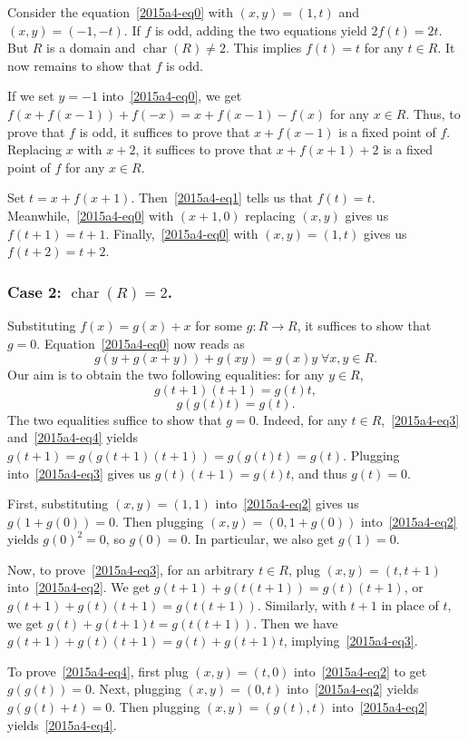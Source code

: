 \documentclass{article}
\DeclareMathOperator{\rchar}{char}
\begin{document}
Consider the equation~\eqref{2015a4-eq0} with $(x, y) = (1, t)$ and $(x, y) = (-1, -t)$.
If $f$ is odd, adding the two equations yield $2 f(t) = 2t$.
But $R$ is a domain and $\rchar(R) \neq 2$.
This implies $f(t) = t$ for any $t \in R$.
It now remains to show that $f$ is odd.

If we set $y = -1$ into~\eqref{2015a4-eq0}, we get $f(x + f(x - 1)) + f(-x) = x + f(x - 1) - f(x)$ for any $x \in R$.
Thus, to prove that $f$ is odd, it suffices to prove that $x + f(x - 1)$ is a fixed point of $f$.
Replacing $x$ with $x + 2$, it suffices to prove that $x + f(x + 1) + 2$ is a fixed point of $f$ for any $x \in R$.

Set $t = x + f(x + 1)$.
Then~\eqref{2015a4-eq1} tells us that $f(t) = t$.
Meanwhile,~\eqref{2015a4-eq0} with $(x + 1, 0)$ replacing $(x, y)$ gives us $f(t + 1) = t + 1$.
Finally,~\eqref{2015a4-eq0} with $(x, y) = (1, t)$ gives us $f(t + 2) = t + 2$.


\subsubsection*{Case 2: $\rchar(R) = 2$.}

Substituting $f(x) = g(x) + x$ for some $g : R \to R$, it suffices to show that $g = 0$.
Equation~\eqref{2015a4-eq0} now reads as
\[ g(y + g(x + y)) + g(xy) = g(x) y \; \forall x, y \in R. \tag{2}\label{2015a4-eq2} \]
Our aim is to obtain the two following equalities: for any $y \in R$,
\[ g(t + 1) (t + 1) = g(t) t, \tag{3}\label{2015a4-eq3} \]
\[ g(g(t) t) = g(t). \tag{4}\label{2015a4-eq4} \]
The two equalities suffice to show that $g = 0$.
Indeed, for any $t \in R$,~\eqref{2015a4-eq3} and~\eqref{2015a4-eq4} yields $g(t + 1) = g(g(t + 1) (t + 1)) = g(g(t) t) = g(t)$.
Plugging into~\eqref{2015a4-eq3} gives us $g(t) (t + 1) = g(t) t$, and thus $g(t) = 0$.

First, substituting $(x, y) = (1, 1)$ into~\eqref{2015a4-eq2} gives us $g(1 + g(0)) = 0$.
Then plugging $(x, y) = (0, 1 + g(0))$ into~\eqref{2015a4-eq2} yields $g(0)^2 = 0$, so $g(0) = 0$.
In particular, we also get $g(1) = 0$.

Now, to prove~\eqref{2015a4-eq3}, for an arbitrary $t \in R$, plug $(x, y) = (t, t + 1)$ into~\eqref{2015a4-eq2}.
We get $g(t + 1) + g(t(t + 1)) = g(t) (t + 1)$, or $g(t + 1) + g(t) (t + 1) = g(t(t + 1))$.
Similarly, with $t + 1$ in place of $t$, we get $g(t) + g(t + 1) t = g(t(t + 1))$.
Then we have $g(t + 1) + g(t) (t + 1) = g(t) + g(t + 1) t$, implying~\eqref{2015a4-eq3}.

To prove~\eqref{2015a4-eq4}, first plug $(x, y) = (t, 0)$ into~\eqref{2015a4-eq2} to get $g(g(t)) = 0$.
Next, plugging $(x, y) = (0, t)$ into~\eqref{2015a4-eq2} yields $g(g(t) + t) = 0$.
Then plugging $(x, y) = (g(t), t)$ into~\eqref{2015a4-eq2} yields~\eqref{2015a4-eq4}.
\end{document}
